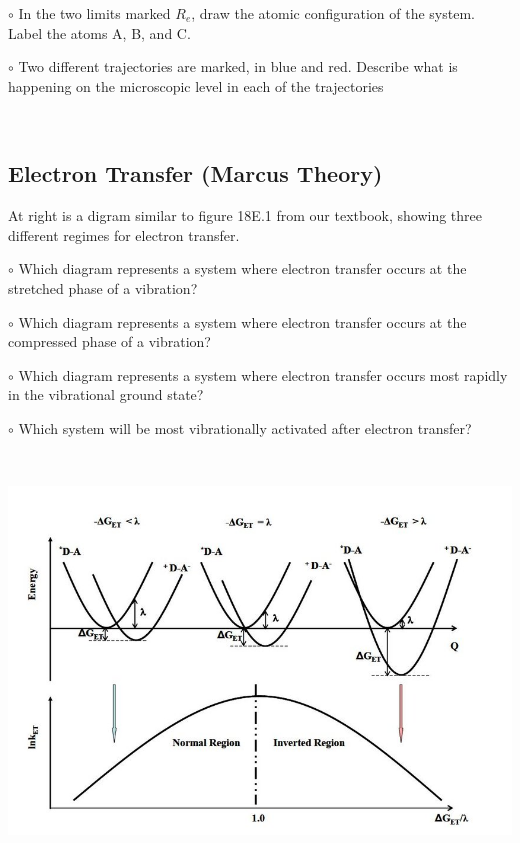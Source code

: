 \documentclass[11pt, letterpaper]{memoir}
\begin{document}
{\begin{minipage}{0.65\linewidth}
\noindent
$\circ$ In the two limits marked $R_e$, draw the atomic configuration of the system. Label the  atoms A, B, and C.

\noindent
$\circ$ Two different trajectories are marked, in blue and red. Describe what is happening on the microscopic level in each of the trajectories

\vspace{5em}
~
\end{minipage}


\subsection*{Electron Transfer (Marcus Theory)}
\noindent
\begin{minipage}{0.5\linewidth}
	At right is a digram similar to figure 18E.1 from our textbook, showing three different regimes for electron transfer.
	
	\noindent
	$\circ$ Which diagram represents a system where electron transfer occurs at the stretched phase of a vibration?
	
	\noindent
	$\circ$ Which diagram represents a system where electron transfer occurs at the compressed phase of a vibration?
	
	\noindent
	$\circ$ Which diagram represents a system where electron transfer occurs most rapidly in the vibrational ground state?
	
	\noindent
	$\circ$ Which system will be most vibrationally activated after electron transfer?
	
\end{minipage} ~ ~ 
\begin{minipage}{0.5\linewidth}\noindent

	\includegraphics[width=\linewidth]{Marcus}
\end{minipage}
\newpage
\pagestyle{empty}
\addtocounter{page}{-1}	
}
\end{document}

